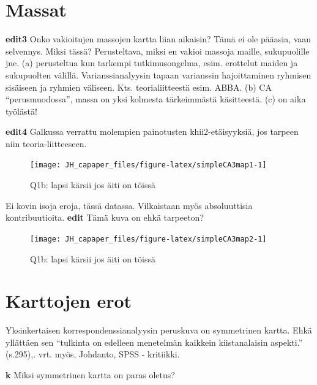 \documentclass[
  finnish,
]{book}
\begin{document}
\hypertarget{massat}{%
\section{Massat}\label{massat}}

\textbf{edit3} Onko vakioitujen massojen kartta liian aikaisin? Tämä ei ole pääasia, vaan selvennys.
Miksi tässä? Perusteltava, miksi en vakioi massoja maille, sukupuolille jne. (a)
perusteltua kun tarkempi tutkimusongelma, esim. erottelut maiden ja sukupuolten
välillä. Varianssianalyysin tapaan varianssin hajoittaminen ryhmisen sisäiseen ja
ryhmien väliseen. Kts. teorialiitteestä esim. ABBA. (b) CA ``perusmuodossa'', massa
on yksi kolmesta tärkeimmästä käsitteestä. (c) on aika työlästä!

\textbf{edit4} Galkussa verrattu molempien painotusten khii2-etäisyyksiä, jos tarpeen
niin teoria-liitteeseen.

\begin{figure}

{\centering \texttt{[image: JH\_capaper\_files/figure-latex/simpleCA3map1-1]} 

}

\caption{Q1b: lapsi kärsii jos äiti on töissä}\label{fig:simpleCA3map1}
\end{figure}

Ei kovin isoja eroja, tässä datassa. Vilkaistaan myös absoluuttisia kontribuutioita.
\textbf{edit} Tämä kuva on ehkä tarpeeton?

\begin{figure}

{\centering \texttt{[image: JH\_capaper\_files/figure-latex/simpleCA3map2-1]} 

}

\caption{Q1b: lapsi kärsii jos äiti on töissä}\label{fig:simpleCA3map2}
\end{figure}

\hypertarget{karttojen-erot}{%
\section{Karttojen erot}\label{karttojen-erot}}

Yksinkertaisen korrespondenssianalyysin peruskuva on symmetrinen kartta. Ehkä
yllättäen sen ``tulkinta on edelleen menetelmän kaikkein kiistanalaisin aspekti.''
\citep{RefWorks:doc:5a857a43e4b0ed2d44664d78} (s.295),\citep{RefWorks:doc:5c768b09e4b02df9431e950a}.
vrt. myös, Johdanto, SPSS - kritiikki.

\textbf{k} Miksi symmetrinen kartta on paras oletus?
\end{document}
